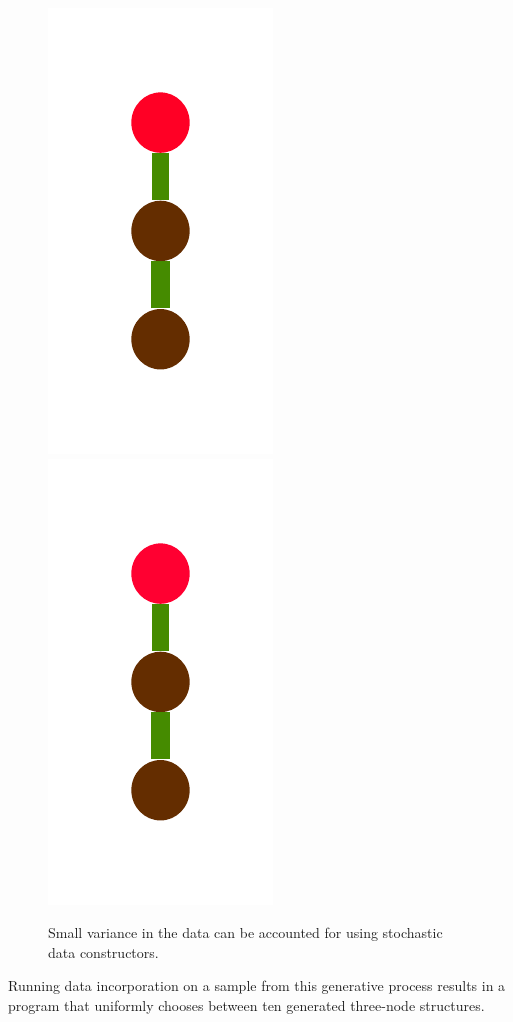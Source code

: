 \documentclass[a4paper,10pt]{article}
\begin{document}
\begin{figure}[t]
\includegraphics[scale=.26]{./figures/4-2-4-constructor-induction-pre-8.pdf}
\includegraphics[scale=.26]{./figures/4-2-4-constructor-induction-pre-9.pdf}
\caption{Small variance in the data can be accounted for using stochastic data constructors.}
\label{fig:noiseCons2}
\end{figure}

Running data incorporation on a sample from this generative process results in a program that uniformly chooses between ten generated three-node structures.
\end{document}
